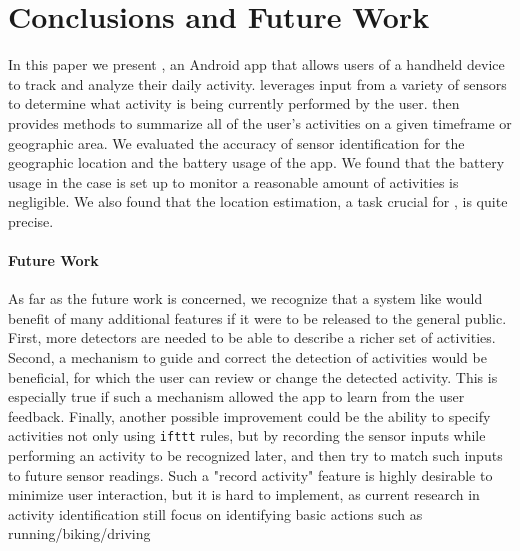 \documentclass{acm_proc_article-sp}
\begin{document}

\section{Conclusions and Future Work}
In this paper we present \LS, an Android app that allows users of a handheld device to track and analyze their daily activity. \LS leverages input from a variety of sensors to determine what activity is being currently performed by the user. \LS then provides methods to summarize all of the user's activities on a given timeframe or geographic area.
We evaluated the accuracy of sensor identification for the geographic location and the battery usage of the app. We found that the battery usage in the case \LS is set up to monitor a reasonable amount of activities is negligible. We also found that the location estimation, a task crucial for \LS, is quite precise.

\paragraph{Future Work} As far as the future work is concerned, we recognize that a system like \LS would benefit of many additional features if it were to be released to the general public. 
First, more detectors are needed to be able to describe a richer set of activities.
Second, a mechanism to guide and correct the detection of activities would be beneficial, for which the user can review or change the detected activity. This is especially true if such a mechanism allowed the app to learn from the user feedback.
Finally, another possible improvement could be the ability to specify activities not only using {\tt ifttt} rules, but by recording the sensor inputs while performing an activity to be recognized later, and then try to match such inputs to future sensor readings. Such a "record activity" feature is highly desirable to minimize user interaction, but it is hard to implement, as current research in activity identification still focus on identifying basic actions such as running/biking/driving ~\cite{mccallmacro}




\end{document}
